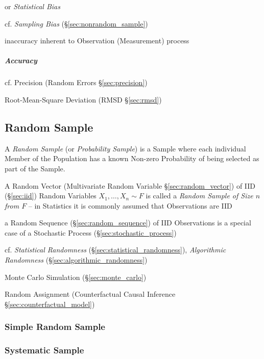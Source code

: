 or \emph{Statistical Bias}

cf. \emph{Sampling Bias} (\S\ref{sec:nonrandom_sample})

inaccuracy inherent to Observation (Measurement) process



\subparagraph{Accuracy}\label{sec:accuracy}\hfill

cf. Precision (Random Errors \S\ref{sec:precision})

\fist Root-Mean-Square Deviation (RMSD \S\ref{sec:rmsd})



\subsection{Random Sample}\label{sec:random_sample}

A \emph{Random Sample} (or \emph{Probability Sample}) is a Sample where each
individual Member of the Population has a known Non-zero Probability of being
selected as part of the Sample.

A Random Vector (Multivariate Random Variable \S\ref{sec:random_vector}) of IID
(\S\ref{sec:iid}) Random Variables $X_1, \ldots, X_n \sim F$ is called a
\emph{Random Sample of Size $n$ from $F$} -- in Statistics it is commonly
assumed that Observations are IID

 a Random Sequence (\S\ref{sec:random_sequence}) of IID Observations is a
 special case of a Stochastic Process (\S\ref{sec:stochastic_process})

\fist cf. \emph{Statistical Randomness} (\S\ref{sec:statistical_randomness}),
\emph{Algorithmic Randomness} (\S\ref{sec:algorithmic_randomness})

\fist Monte Carlo Simulation (\S\ref{sec:monte_carlo})

\fist Random Assignment (Counterfactual Causal Inference
\S\ref{sec:counterfactual_model})



\subsubsection{Simple Random Sample}\label{sec:simple_random_sample}

\subsubsection{Systematic Sample}\label{sec:systematic_sample}


